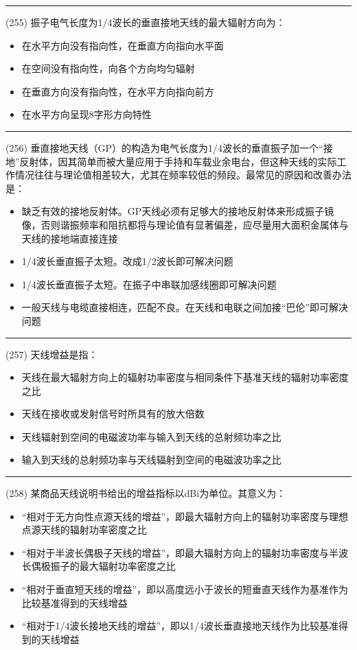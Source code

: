 \documentclass[twocolumn]{ctexart}  %
\begin{document}
\noindent\rule{0.5\textwidth}{1pt}
\heiti (255) 振子电气长度为1/4波长的垂直接地天线的最大辐射方向为： \songti {\color{gray} [LK0919] }
\begin{itemize}
	\item  在水平方向没有指向性，在垂直方向指向水平面
	\item  在空间没有指向性，向各个方向均匀辐射
	\item  在垂直方向没有指向性，在水平方向指向前方
	\item  在水平方向呈现8字形方向特性
\end{itemize}


\noindent\rule{0.5\textwidth}{1pt}
\heiti (256) 垂直接地天线（GP）的构造为电气长度为1/4波长的垂直振子加一个“接地”反射体，因其简单而被大量应用于手持和车载业余电台，但这种天线的实际工作情况往往与理论值相差较大，尤其在频率较低的频段。最常见的原因和改善办法是： \songti {\color{gray} [LK0925] }
\begin{itemize}
	\item  缺乏有效的接地反射体。GP天线必须有足够大的接地反射体来形成振子镜像，否则谐振频率和阻抗都将与理论值有显著偏差，应尽量用大面积金属体与天线的接地端直接连接
	\item  1/4波长垂直振子太短。改成1/2波长即可解决问题
	\item  1/4波长垂直振子太短。在振子中串联加感线圈即可解决问题
	\item  一般天线与电缆直接相连，匹配不良。在天线和电联之间加接“巴伦”即可解决问题
\end{itemize}


\noindent\rule{0.5\textwidth}{1pt}
\heiti (257) 天线增益是指： \songti {\color{gray} [LK0926] }
\begin{itemize}
	\item  天线在最大辐射方向上的辐射功率密度与相同条件下基准天线的辐射功率密度之比
	\item  天线在接收或发射信号时所具有的放大倍数
	\item  天线辐射到空间的电磁波功率与输入到天线的总射频功率之比
	\item  输入到天线的总射频功率与天线辐射到空间的电磁波功率之比
\end{itemize}


\noindent\rule{0.5\textwidth}{1pt}
\heiti (258) 某商品天线说明书给出的增益指标以dBi为单位。其意义为： \songti {\color{gray} [LK0929] }
\begin{itemize}
	\item  “相对于无方向性点源天线的增益”，即最大辐射方向上的辐射功率密度与理想点源天线的辐射功率密度之比
	\item  “相对于半波长偶极子天线的增益”，即最大辐射方向上的辐射功率密度与半波长偶极振子的最大辐射功率密度之比
	\item  “相对于垂直短天线的增益”，即以高度远小于波长的短垂直天线作为基准作为比较基准得到的天线增益
	\item  “相对于1/4波长接地天线的增益”，即以1/4波长垂直接地天线作为比较基准得到的天线增益
\end{itemize}
\end{document}
